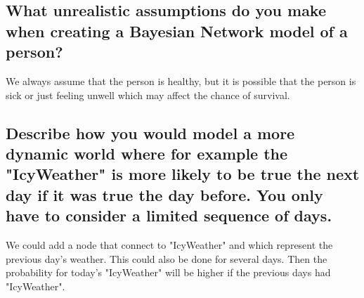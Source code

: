\documentclass[a4paper,10pt]{article}
\begin{document}
 \subsection{What unrealistic assumptions do you make when creating a Bayesian Network model of a person?}

 We always assume that the person is healthy, but it is possible that the person is sick or just feeling unwell which may affect the chance of survival. 

\subsection{Describe how you would model a more dynamic world where for example the "IcyWeather" is more likely to be true the next day if it was true the day before. 
You only have to consider a limited sequence of days.}

We could add a node that connect to "IcyWeather" and which represent the previous day's weather.
This could also be done for several days.
Then the probability for today's "IcyWeather" will be higher if the previous days had "IcyWeather".
\end{document}
